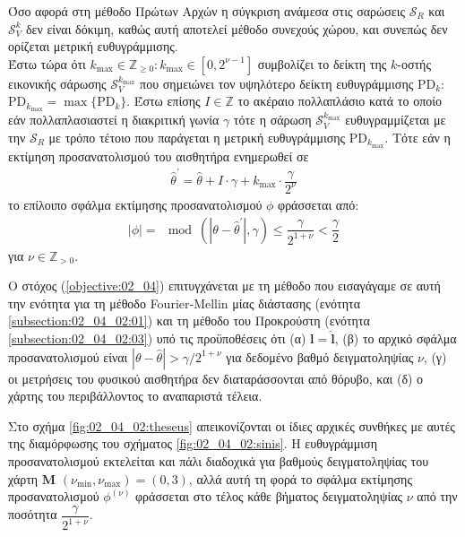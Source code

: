 Όσο αφορά στη μέθοδο Πρώτων Αρχών η σύγκριση ανάμεσα στις σαρώσεις
$\mathcal{S}_R$ και $\mathcal{S}_V^k$ δεν είναι δόκιμη, καθώς αυτή αποτελεί
μέθοδο συνεχούς χώρου, και συνεπώς δεν ορίζεται μετρική ευθυγράμμισης. \\

Έστω τώρα ότι $k_{\max} \in \mathbb{Z}_{\geq 0} : k_{\max} \in [0,2^{\nu-1}]$
συμβολίζει το δείκτη της $k$-οστής εικονικής σάρωσης $\mathcal{S}_V^{k_{\max}}$
που σημειώνει τον υψηλότερο δείκτη ευθυγράμμισης PD$_k$:
$\text{PD}_{k_{\max}} = \max \{\text{PD}_k\}$. Έστω επίσης $I \in \mathbb{Z}$
το ακέραιο πολλαπλάσιο κατά το οποίο εάν πολλαπλασιαστεί η διακριτική γωνία
$\gamma$ τότε η σάρωση $\mathcal{S}_V^{k_{\max}}$ ευθυγραμμίζεται με την
$\mathcal{S}_R$ με τρόπο τέτοιο που παράγεται η μετρική ευθυγράμμισης
PD$_{k_{\max}}$. Τότε εάν η εκτίμηση προσανατολισμού του αισθητήρα ενημερωθεί
σε
\begin{align}
  \hat{\theta}^\prime = \hat{\theta} + I \cdot \gamma + k_{\max} \cdot \dfrac{\gamma}{2^\nu}
\end{align}
το επίλοιπο σφάλμα εκτίμησης προσανατολισμού $\phi$ φράσσεται από:
\begin{align}
  |\phi| = \mod(|\theta - \hat{\theta}^\prime|, \gamma) \leq \dfrac{\gamma}{2^{1+\nu}} < \dfrac{\gamma}{2}
  \label{eq:phi_theseus}
\end{align}
για $\nu \in \mathbb{Z}_{>0}$.

Ο στόχος (\ref{objective:02_04}) επιτυγχάνεται με τη μέθοδο που εισαγάγαμε σε
αυτή την ενότητα για τη μέθοδο Fourier-Mellin μίας διάστασης (ενότητα
\ref{subsection:02_04_02:01}) και τη μέθοδο του Προκρούστη (ενότητα
\ref{subsection:02_04_02:03}) υπό τις προϋποθέσεις ότι (α)
$\bm{l} = \hat{\bm{l}}$, (β) το αρχικό σφάλμα προσανατολισμού είναι
$|\theta - \hat{\theta}| > \gamma / 2^{1+\nu}$ για δεδομένο βαθμό
δειγματοληψίας $\nu$, (γ) οι μετρήσεις του φυσικού αισθητήρα δεν διαταράσσονται
από θόρυβο, και (δ) ο χάρτης του περιβάλλοντος το αναπαριστά τέλεια.

Στο σχήμα \ref{fig:02_04_02:theseus} απεικονίζονται οι ίδιες αρχικές συνθήκες
με αυτές της διαμόρφωσης του σχήματος \ref{fig:02_04_02:sinis}. Η ευθυγράμμιση
προσανατολισμού εκτελείται και πάλι διαδοχικά για βαθμούς δειγματοληψίας του
χάρτη $\bm{M}$ $(\nu_{\min}, \nu_{\max}) = (0,3)$, αλλά αυτή τη φορά το σφάλμα
εκτίμησης προσανατολισμού $\phi^{(\nu)}$ φράσσεται στο τέλος κάθε βήματος
δειγματοληψίας $\nu$ από την ποσότητα $\dfrac{\gamma}{2^{1+\nu}}$.

